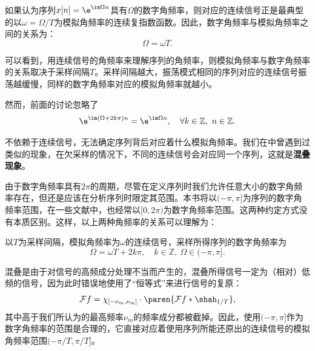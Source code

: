 如果认为序列$x[n]=\e^{\im\Omega n}$具有$\Omega$的数字角频率，则对应的连续信号正是最典型的以$\omega=\Omega/T$为模拟角频率的连续复指数函数。因此，数字角频率与模拟角频率之间的关系为：
\begin{equation}
    \Omega=\omega T.
\end{equation}

可以看到，用连续信号的角频率来理解序列的角频率，则模拟角频率与数字角频率的关系取决于采样间隔$T$。采样间隔越大，振荡模式相同的序列对应的连续信号振荡越缓慢，同样的数字角频率对应的模拟角频率就越小。

然而，前面的讨论忽略了
\begin{equation}
    \e^{\im(\Omega+2k\pi)n}=\e^{\im\Omega n},\quad \forall k\in\mathbb{Z},\ n\in\mathbb{Z}.
\end{equation}

不依赖于连续信号，无法确定序列背后对应着什么模拟角频率。我们在中曾遇到过类似的现象，在欠采样的情况下，不同的连续信号会对应同一个序列，这就是\textbf{混叠现象}。

由于数字角频率具有$2\pi$的周期，尽管在定义序列时我们允许任意大小的数字角频率存在，但还是应该在分析序列时限定其范围。本书将以$(-\pi,\pi]$为序列的数字角频率范围\cite{signal_systems}，在一些文献中，也经常以$[0,2\pi)$为数字角频率范围。这两种约定方式没有本质区别。这样，以上两种角频率的关系可以理解为：

\begin{proposition}
    以$T$为采样间隔，模拟角频率为$\omega$的连续信号，采样所得序列的数字角频率为
    \begin{equation}
        \Omega=\omega T+2k\pi,\quad k\in\mathbb{Z},\ \Omega\in(-\pi,\pi].
    \end{equation}
\end{proposition}

混叠是由于对信号的高频成分处理不当而产生的，混叠所得信号一定为（相对）低频的信号，因为此时错误地使用了“恒等式”来进行信号的复原：
\begin{equation}
    \mathcal{F} f=\chi_{[-\nu_m,\nu_m]}\cdot\paren{\mathcal{F} f*\shah_{1/T}},
\end{equation}
其中高于我们所认为的最高频率$\nu_m$的频率成分都被截掉。因此，使用$(-\pi,\pi]$作为数字角频率的范围是合理的，它直接对应着使用序列所能还原出的连续信号的模拟角频率范围$(-\pi/T,\pi/T]$。

